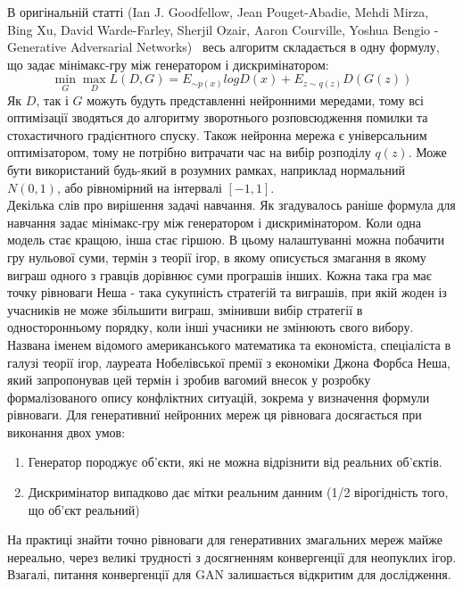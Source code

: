 \documentclass{article}
\begin{document}
	\null\quad В оригінальній статті (Ian J. Goodfellow, Jean Pouget-Abadie, Mehdi Mirza, Bing Xu, David Warde-Farley, Sherjil Ozair, Aaron Courville, Yoshua Bengio -  Generative Adversarial Networks)  весь алгоритм складається в одну формулу, що задає мінімакс-гру між генератором і дискримінатором:
	$$\min_G\max_D L(D, G) = E_{ \sim p(x)} log D(x) + E_{z \sim q(z)} D(G(z))$$ 
	\null\quad Як $D$, так і $G$ можуть будуть представленні нейронними мередами, тому всі оптимізації зводяться до алгоритму зворотнього розповсюдження помилки та стохастичного градієнтного спуску. Також нейронна мережа є універсальним оптимізатором, тому не потрібно витрачати час на вибір розподілу $q(z)$. Може бути використаний будь-який в розумних рамках, наприклад нормальний $N(0, 1)$, або рівномірний на інтервалі $[-1, 1]$.\\
	\null\quad Декілька слів про вирішення задачі навчання.  Як згадувалось раніше формула для навчання задає мінімакс-гру між генератором і дискримінатором. Коли одна модель стає кращою, інша стає гіршою.  В цьому налаштуванні можна побачити гру нульової суми, термін з теорії ігор, в якому описується змагання в якому виграш одного з гравців дорівнює суми програшів інших. Кожна така гра має точку рівноваги Неша - така сукупність стратегій та виграшів, при якій жоден із учасників не може збільшити виграш, змінивши вибір стратегії в односторонньому порядку, коли інші учасники не змінюють свого вибору. Названа іменем відомого американського математика та економіста, спеціаліста в галузі теорії ігор, лауреата Нобелівської премії з економіки Джона Форбса Неша, який запропонував цей термін і зробив вагомий внесок у розробку формалізованого опису конфліктних ситуацій, зокрема у визначення формули рівноваги. Для генеративниї нейронних мереж ця рівновага досягається при виконання двох умов:
	\begin{enumerate}
		\item Генератор породжує об'єкти, які не можна відрізнити від реальних об'єктів.
		\item Дискримінатор випадково дає мітки реальним данним (1/2 вірогідність того, що об'єкт реальний)
	\end{enumerate} 
	\null\quad На практиці знайти точно рівноваги для генеративних змагальних мереж майже нереально, через великі трудності з досягненням конвергенції для неопуклих ігор. Взагалі, питання конвергенції для GAN залишається відкритим для дослідження.
	
\end{document}

